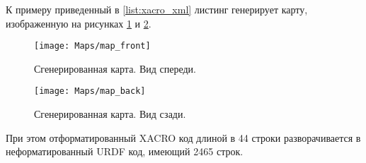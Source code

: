 К примеру приведенный в \ref{list:xacro_xml} листинг генерирует карту, изображенную на рисунках \ref{fig:6_2_1} и \ref{fig:6_2_2}.
\begin{figure}[h!]
	\centering
	\texttt{[image: Maps/map\_front]}
	\caption{Сгенерированная карта. Вид спереди.}
	\label{fig:6_2_1}
\end{figure}
\begin{figure}[h!]
	\centering
	\texttt{[image: Maps/map\_back]}
	\caption{Сгенерированная карта. Вид сзади.}
	\label{fig:6_2_2}
\end{figure}
При этом отформатированный XACRO код длиной в 44 строки разворачивается в неформатированный URDF код, имеющий 2465 строк.
